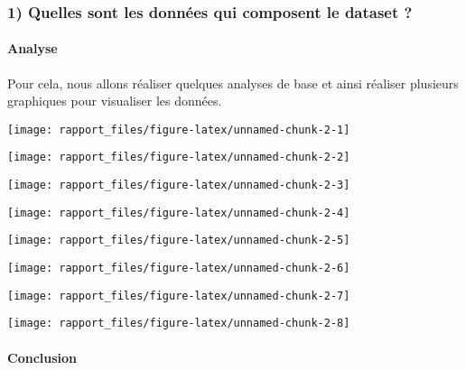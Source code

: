 \documentclass[
]{article}
\begin{document}
\subsubsection{1) Quelles sont les données qui composent le dataset
?}\label{quelles-sont-les-donnuxe9es-qui-composent-le-dataset}

\paragraph{\texorpdfstring{\textbf{Analyse}}{Analyse}}\label{analyse-1}

Pour cela, nous allons réaliser quelques analyses de base et ainsi
réaliser plusieurs graphiques pour visualiser les données.

\begin{center}\texttt{[image: rapport\_files/figure-latex/unnamed-chunk-2-1]} \end{center}

\begin{center}\texttt{[image: rapport\_files/figure-latex/unnamed-chunk-2-2]} \end{center}

\begin{center}\texttt{[image: rapport\_files/figure-latex/unnamed-chunk-2-3]} \end{center}

\begin{center}\texttt{[image: rapport\_files/figure-latex/unnamed-chunk-2-4]} \end{center}

\begin{center}\texttt{[image: rapport\_files/figure-latex/unnamed-chunk-2-5]} \end{center}

\begin{center}\texttt{[image: rapport\_files/figure-latex/unnamed-chunk-2-6]} \end{center}

\begin{center}\texttt{[image: rapport\_files/figure-latex/unnamed-chunk-2-7]} \end{center}

\begin{center}\texttt{[image: rapport\_files/figure-latex/unnamed-chunk-2-8]} \end{center}

\paragraph{\texorpdfstring{\textbf{Conclusion}}{Conclusion}}\label{conclusion}
\end{document}
